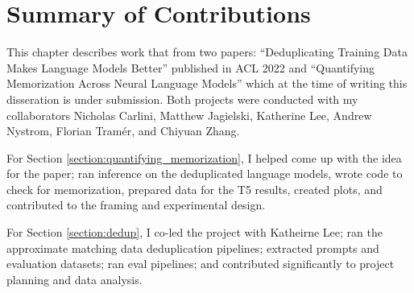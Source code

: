 \section{Summary of Contributions}
This chapter describes work that from two papers: ``Deduplicating Training Data Makes Language Models Better'' published in ACL 2022 and ``Quantifying Memorization Across Neural Language Models'' which at the time of writing this disseration is under submission.
Both projects were conducted with my collaborators Nicholas Carlini, Matthew Jagielski, Katherine Lee, Andrew Nystrom, Florian Tram\'er, and Chiyuan Zhang.

For Section \ref{section:quantifying_memorization}, I helped come up with the idea for the paper; ran inference on the deduplicated language models, wrote code to check for memorization, prepared data for the T5 results, created plots, and contributed to the framing and experimental design. 

For Section \ref{section:dedup}, I co-led the project with Katheirne Lee; ran the approximate matching data deduplication pipelines; extracted prompts and evaluation datasets; ran eval pipelines; and contributed significantly to project planning and data analysis.